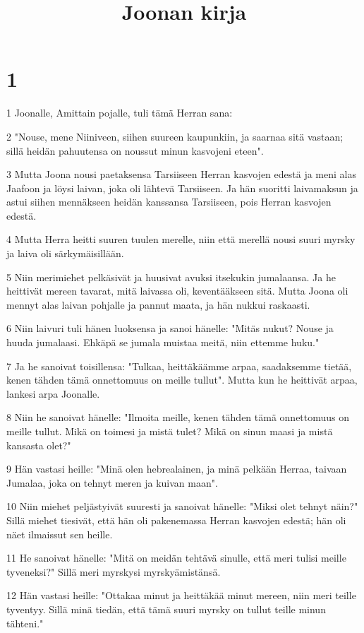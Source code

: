 

\title{Joonan kirja}


\chapter{1}

\par 1 Joonalle, Amittain pojalle, tuli tämä Herran sana:
\par 2 "Nouse, mene Niiniveen, siihen suureen kaupunkiin, ja saarnaa sitä vastaan; sillä heidän pahuutensa on noussut minun kasvojeni eteen".
\par 3 Mutta Joona nousi paetaksensa Tarsiiseen Herran kasvojen edestä ja meni alas Jaafoon ja löysi laivan, joka oli lähtevä Tarsiiseen. Ja hän suoritti laivamaksun ja astui siihen mennäkseen heidän kanssansa Tarsiiseen, pois Herran kasvojen edestä.
\par 4 Mutta Herra heitti suuren tuulen merelle, niin että merellä nousi suuri myrsky ja laiva oli särkymäisillään.
\par 5 Niin merimiehet pelkäsivät ja huusivat avuksi itsekukin jumalaansa. Ja he heittivät mereen tavarat, mitä laivassa oli, keventääkseen sitä. Mutta Joona oli mennyt alas laivan pohjalle ja pannut maata, ja hän nukkui raskaasti.
\par 6 Niin laivuri tuli hänen luoksensa ja sanoi hänelle: "Mitäs nukut? Nouse ja huuda jumalaasi. Ehkäpä se jumala muistaa meitä, niin ettemme huku."
\par 7 Ja he sanoivat toisillensa: "Tulkaa, heittäkäämme arpaa, saadaksemme tietää, kenen tähden tämä onnettomuus on meille tullut". Mutta kun he heittivät arpaa, lankesi arpa Joonalle.
\par 8 Niin he sanoivat hänelle: "Ilmoita meille, kenen tähden tämä onnettomuus on meille tullut. Mikä on toimesi ja mistä tulet? Mikä on sinun maasi ja mistä kansasta olet?"
\par 9 Hän vastasi heille: "Minä olen hebrealainen, ja minä pelkään Herraa, taivaan Jumalaa, joka on tehnyt meren ja kuivan maan".
\par 10 Niin miehet peljästyivät suuresti ja sanoivat hänelle: "Miksi olet tehnyt näin?" Sillä miehet tiesivät, että hän oli pakenemassa Herran kasvojen edestä; hän oli näet ilmaissut sen heille.
\par 11 He sanoivat hänelle: "Mitä on meidän tehtävä sinulle, että meri tulisi meille tyveneksi?" Sillä meri myrskysi myrskyämistänsä.
\par 12 Hän vastasi heille: "Ottakaa minut ja heittäkää minut mereen, niin meri teille tyventyy. Sillä minä tiedän, että tämä suuri myrsky on tullut teille minun tähteni."
